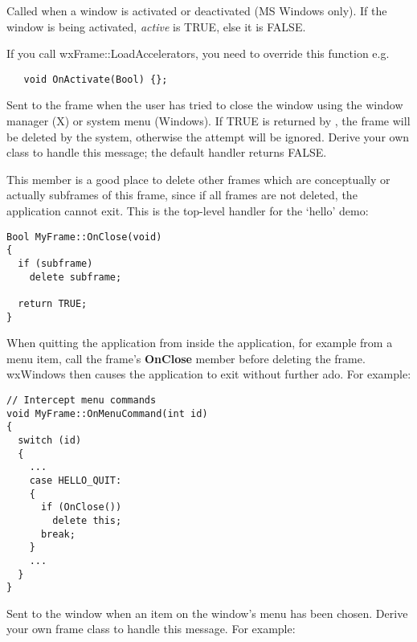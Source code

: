 
Called when a window is activated or deactivated (MS Windows
only). If the window is being activated, {\it active} is TRUE, else it
is FALSE.

If you call wxFrame::LoadAccelerators, you need to override this function e.g.

\begin{verbatim}
   void OnActivate(Bool) {};
\end{verbatim}

\label{wxframeonclose}


Sent to the frame when the user has tried to close the window using the
window manager (X) or system menu (Windows).  If TRUE is returned by
, the frame will be deleted by the system, otherwise the
attempt will be ignored. Derive your own class to handle this message;
the default handler returns FALSE.

This member is a good place to delete other frames which are
conceptually or actually subframes of this frame, since if all frames
are not deleted, the application cannot exit. This is the top-level
 handler for the `hello' demo:

\begin{verbatim}
Bool MyFrame::OnClose(void)
{
  if (subframe)
    delete subframe;

  return TRUE;
}
\end{verbatim}

When quitting the application from inside the application, for example
from a menu item, call the frame's {\bf OnClose} member before deleting
the frame. wxWindows then causes the application to exit without further
ado. For example:

\begin{verbatim}
// Intercept menu commands
void MyFrame::OnMenuCommand(int id)
{
  switch (id)
  {
    ...
    case HELLO_QUIT:
    {
      if (OnClose())
        delete this;
      break;
    }
    ...
  }
}
\end{verbatim}

\label{wxframeonmenucommand}


Sent to the window when an item on the window's menu has been chosen.
Derive your own frame class to handle this message. For example:

